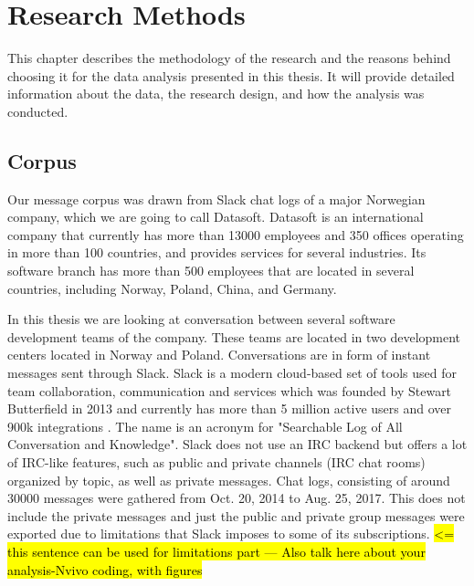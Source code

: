 \chapter{Research Methods}
This chapter describes the methodology of the research and the reasons behind choosing it for the data analysis presented in this thesis. It will provide detailed information about the data, the research design, and how the analysis was conducted.


\section{Corpus}
Our message corpus was drawn from Slack chat logs of a major Norwegian company, which we are going to call Datasoft. Datasoft is an international company that currently has more than 13000 employees and 350 offices operating in more than 100 countries, and provides services for several industries. Its software branch has more than 500 employees that are located in several countries, including Norway, Poland, China, and Germany. 

In this thesis we are looking at conversation between several software development teams of the company. These teams are located in two development centers located in Norway and Poland. Conversations are in form of instant messages sent through Slack. Slack is a modern cloud-based set of tools used for team collaboration, communication and services which was founded by Stewart Butterfield in 2013 and currently has more than 5 million active users and over 900k integrations \citep{Lin2016WhySlack}. The name is an acronym for "Searchable Log of All Conversation and Knowledge". Slack does not use an IRC backend but offers a lot of IRC-like features, such as public and private channels (IRC chat rooms) organized by topic, as well as private messages. 
Chat logs, consisting of around 30000 messages were gathered from Oct. 20, 2014 to Aug. 25, 2017. This does not include the private messages and just the public and private group messages were exported due to limitations that Slack imposes to some of its subscriptions. \hl{<= this sentence can be used for limitations part --- Also talk here about your analysis-Nvivo coding, with figures}

